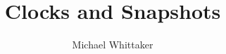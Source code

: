 \documentclass{beamer}
\title{Clocks and Snapshots}
\author{Michael Whittaker}
\begin{document}
\begin{frame}
  \titlepage
\end{frame}

% 
\end{document}
